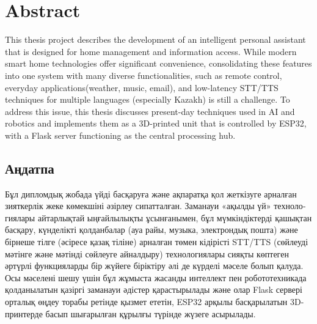 \chapter*{Abstract}

This thesis project describes the development of an intelligent personal assistant that is designed for home management and information access. While modern smart home technologies offer significant convenience, consolidating these features into one system with many diverse functionalities, such as remote control, everyday applications(weather, music, email), and low-latency STT/TTS techniques for multiple languages (especially Kazakh) is still a challenge. To address this issue, this thesis discusses present-day techniques used in AI and robotics and implements them as a 3D-printed unit that is controlled by ESP32, with a Flask server functioning as the central processing hub. 



\begin{otherlanguage}{russian} %
\chapter*{Аңдатпа}
Бұл дипломдық жобада үйді басқаруға және ақпаратқа қол жеткізуге арналған зияткерлік жеке көмекшіні әзірлеу сипатталған. Заманауи «ақылды үй» технологиялары айтарлықтай ыңғайлылықты ұсынғанымен, бұл мүмкіндіктерді қашықтан басқару, күнделікті қолданбалар (ауа райы, музыка, электрондық пошта) және бірнеше тілге (әсіресе қазақ тіліне) арналған төмен кідірісті STT/TTS (сөйлеуді мәтінге және мәтінді сөйлеуге айналдыру) технологиялары сияқты көптеген әртүрлі функцияларды бір жүйеге біріктіру әлі де күрделі мәселе болып қалуда. Осы мәселені шешу үшін бұл жұмыста жасанды интеллект пен робототехникада қолданылатын қазіргі заманауи әдістер қарастырылады және олар Flask сервері орталық өңдеу торабы ретінде қызмет ететін, ESP32 арқылы басқарылатын 3D-принтерде басып шығарылған құрылғы түрінде жүзеге асырылады.
\end{otherlanguage}

